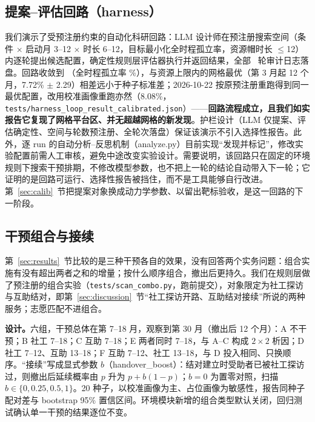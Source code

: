 \documentclass[10.5pt,twocolumn]{ctexart}
\begin{document}
\subsection{提案--评估回路（harness）}\label{sec:harness}
我们演示了受预注册约束的自动化科研回路：LLM 设计师在预注册搜索空间（条件 $\times$ 启动月 3--12 $\times$ 时长 6--12，目标最小化全时程孤立率，资源帽时长 $\le$12）内逐轮提出候选配置，确定性规则层评估器执行并返回结果，全部 \LoopIters\ 轮审计日志落盘。回路收敛到 \LoopBestDesc（全时程孤立率 \LoopBestScore\%），与资源上限内的网格最优（第 3 月起 12 个月，7.72\% $\pm$ 2.29）相差远小于种子标准差；2026-10-22 按原预注册重跑得到同一最优配置，改用校准画像重跑亦然（8.08\%，\texttt{tests/harness\_loop\_result\_calibrated.json}）——\textbf{回路流程成立，且我们如实报告它复现了网格平台区、并无超越网格的新发现}。护栏设计（LLM 仅提案、评估确定性、空间与轮数预注册、全轮次落盘）保证该演示不引入选择性报告。此外，逐 run 的自动分析--反思机制（analyze.py）目前实现``发现并标记''，修改实验配置前需人工审核，避免中途改变实验设计。需要说明，该回路只在固定的环境规则下搜索干预排期，不修改模型参数，也不把上一轮的结论自动带入下一轮；它证明的是回路可运行、选择性报告被挡住，而不是工具能够自行改进。第~\ref{sec:calib}~节把提案对象换成动力学参数、以留出靶标验收，是这一回路的下一阶段。

\subsection{干预组合与接续}\label{sec:combo}
第~\ref{sec:results}~节比较的是三种干预各自的效果，没有回答两个实务问题：组合实施有没有超出两者之和的增量；按什么顺序组合，撤出后更持久。我们在规则层做了预注册的组合实验（\texttt{tests/scan\_combo.py}，跑前提交），对象限定为社工探访与互助结对，即第~\ref{sec:discussion}~节``社工探访开路、互助结对接续''所说的两种服务；志愿匹配不进组合。

\textbf{设计。}六组，干预总体在第 7--18 月，观察到第 30 月（撤出后 12 个月）：A 不干预；B 社工 7--18；C 互助 7--18；E 两者同时 7--18，与 A--C 构成 $2\times2$ 析因；D 社工 7--12、互助 13--18；F 互助 7--12、社工 13--18，与 D 投入相同、只换顺序。``接续''写成显式参数 $b$（handover\_boost）：结对建立时受助者已被社工探访过，则撤出后延续概率由 $p$ 升为 $p+b(1-p)$；$b=0$ 为置零对照，扫描 $b\in\{0,0.25,0.5,1\}$。20 种子，以校准画像为主、占位画像为敏感性，报告同种子配对差与 bootstrap 95\% 置信区间。环境模块新增的组合类型默认关闭，回归测试确认单一干预的结果逐位不变。
\end{document}
